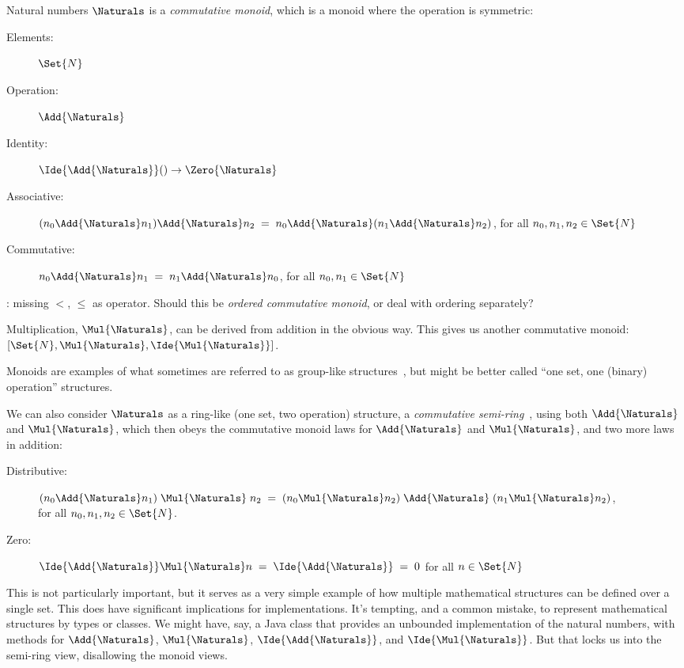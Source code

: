 \documentclass[12pt]{PalisadesLakesBook}
\begin{document}
\begin{plSection}{Natural numbers}
$\Naturals$ is a \emph{commutative monoid},
which is a monoid where the operation is symmetric:
\begin{description}
\item[Elements:] $\Set{N}$
\item[Operation:] $\Add{\Naturals}$
\item[Identity:] $\Ide{\Add{\Naturals}}() \rightarrow \Zero{\Naturals}$
\item[Associative:] 
$(n_0 \Add{\Naturals} n_1) \Add{\Naturals} n_2 \;=\;
n_0 \Add{\Naturals} (n_1 \Add{\Naturals} n_2)$, 
for all $n_0, n_1, n_2 \in \Set{N}$
\item[Commutative:] $n_0 \Add{\Naturals} n_1 \;=\;
n_1 \Add{\Naturals} n_0$,
for all $n_0, n_1 \in \Set{N}$
\end{description}

\TODO: missing $<$, $\leq$ as operator.
Should this be \emph{ordered commutative monoid},
or deal with ordering separately?

Multiplication, $\Mul{\Naturals}$, can be derived from addition in the
obvious way.
This gives us another commutative monoid:
$[\Set{N}, \Mul{\Naturals}, \Ide{\Mul{\Naturals}}]$.

Monoids are examples of what sometimes are referred to 
as group-like structures~\cite{wiki:GroupLike},
but might be better called ``one set, one (binary) operation''
structures.

We can also consider $\Naturals$ as a ring-like
(one set, two operation)
structure, a \emph{commutative semi-ring}~\cite{wiki:Semiring}, 
using both $\Add{\Naturals}$ and $\Mul{\Naturals}$,
which then obeys the commutative monoid laws for
$\Add{\Naturals}$ and $\Mul{\Naturals}$, and two more laws in addition:
\begin{description}
\item[Distributive:] 
$(n_0 \Add{\Naturals} n_1) \; \Mul{\Naturals}\; n_2 \;=\;
(n_0 \Mul{\Naturals} n_2) \; \Add{\Naturals} \; (n_1 \Mul{\Naturals} n_2)$, \\
for all $n_0, n_1, n_2 \in \Set{N}$.
\item[Zero:] $\Ide{\Add{\Naturals}} \Mul{\Naturals} n 
\; = \; \Ide{\Add{\Naturals}}
\; = \; 0$ for all $n \in \Set{N}$
\end{description}

This is not particularly important, but it serves as 
a very simple example
of how multiple mathematical structures can be defined
over a single set.
This does have significant implications for implementations.
It's tempting, and a common mistake, 
to represent mathematical structures by types or classes.
We might have, say, a Java class that provides an
unbounded implementation of the natural numbers,
with methods for $\Add{\Naturals}$, $\Mul{\Naturals}$, 
$\Ide{\Add{\Naturals}}$,
and $\Ide{\Mul{\Naturals}}$.
But that locks us into the semi-ring view,
disallowing the monoid views.


\end{plSection}
\end{document}
